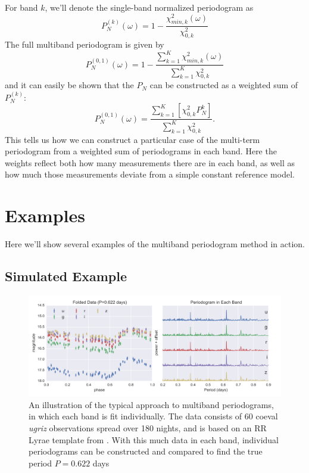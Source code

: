 \documentclass[12pt,preprint]{aastex}
\newcommand{\figlabel}[1]{\label{fig:#1}}
\newcommand{\sectlabel}[1]{\label{sect:#1}}
\begin{document}
For band $k$, we'll denote the single-band normalized periodogram as
\begin{equation}
  P_N^{(k)}(\omega) = 1 - \frac{\chi^2_{min, k}(\omega)}{\chi^2_{0,k}}
\end{equation}
The full multiband periodogram is given by
\begin{equation}
  P_N^{(0,1)}(\omega) = 1 - \frac{\sum_{k=1}^K\chi^2_{min, k}(\omega)}{\sum_{k=1}^K\chi^2_{0,k}}
\end{equation}
and it can easily be shown that the $P_N$ can be constructed as a weighted sum of $P_N^{(k)}$:
\begin{equation}
  P_N^{(0,1)}(\omega) = \frac{\sum_{k=1}^K\left[\chi^2_{0,k}P_N^{k}\right]}{\sum_{k=1}^K\chi^2_{0,k}}.
\end{equation}
This tells us how we can construct a particular case of the multi-term periodogram from a weighted sum of periodograms in each band. Here the weights reflect both how many measurements there are in each band, as well as how much those measurements deviate from a simple constant reference model.

\section{Examples}
Here we'll show several examples of the multiband periodogram method in action.

\subsection{Simulated Example}
\sectlabel{Simulated}

\begin{figure}
  \centering
  \includegraphics[width=\textwidth]{fig05.pdf}
  \caption{
    An illustration of the typical approach to multiband periodograms,
    in which each band is fit individually. The data consists of 60 coeval
    {\it ugriz} observations spread over 180 nights, and is based on an
    RR Lyrae template from \citet{Sesar2010}. With this much data in each
    band, individual periodograms can be constructed and compared to find the
    true period $P=0.622$ days
  }
  \figlabel{adhoc_example}
\end{figure}
\end{document}
